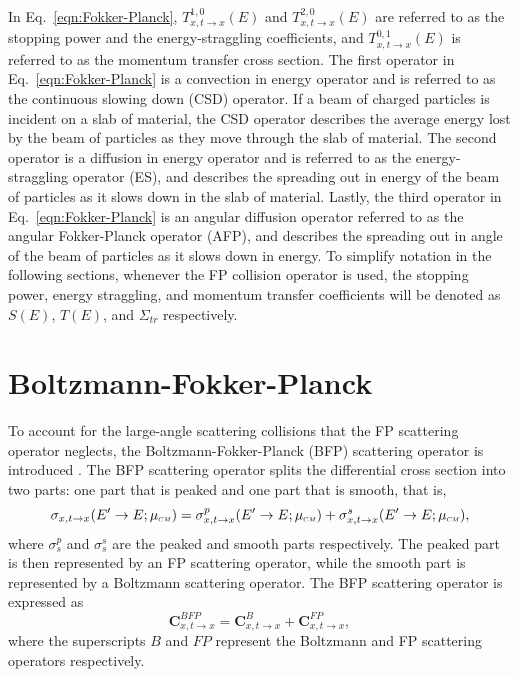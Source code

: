\documentclass[../main.tex]{subfiles}
\begin{document}
In Eq.~\eqref{eqn:Fokker-Planck}, $T_{x,t \rightarrow x}^{1,0}(E)$ and $T_{x,t \rightarrow x}^{2,0}(E)$ are referred to as the stopping power and the energy-straggling coefficients, and $T_{x,t \rightarrow x}^{0,1}(E)$ is referred to as the momentum transfer cross section. The first operator in Eq.~\eqref{eqn:Fokker-Planck} is a convection in energy operator and is referred to as the continuous slowing down (CSD) operator. If a beam of charged particles is incident on a slab of material, the CSD operator describes the average energy lost by the beam of particles as they move through the slab of material. The second operator is a diffusion in energy operator and is referred to as the energy-straggling operator (ES), and describes the spreading out in energy of the beam of particles as it slows down in the slab of material. Lastly, the third operator in Eq.~\eqref{eqn:Fokker-Planck} is an angular diffusion operator referred to as the angular Fokker-Planck operator (AFP), and describes the spreading out in angle of the beam of particles as it slows down in energy. To simplify notation in the following sections, whenever the FP collision operator is used, the stopping power, energy straggling, and momentum transfer coefficients will be denoted as $S(E)$, $T(E)$, and $\Sigma_{tr}$ respectively.

\section{Boltzmann-Fokker-Planck}
To account for the large-angle scattering collisions that the FP scattering operator neglects, the Boltzmann-Fokker-Planck (BFP) scattering operator is introduced \cite{Ligou-1986}. The BFP scattering operator splits the differential cross section into two parts: one part that is peaked and one part that is smooth, that is,
\begin{equation}
    \sigma_{x,t \rightarrow x}(E^{\prime} \rightarrow E; \mucm) = \sigma_{x,t \rightarrow x}^{p}(E^{\prime} \rightarrow E; \mucm) + \sigma_{x,t \rightarrow x}^{s}(E^{\prime} \rightarrow E; \mucm),
\end{equation}
where $\sigma_s^{p}$ and $\sigma_s^{s}$ are the peaked and smooth parts respectively. The peaked part is then represented by an FP scattering operator, while the smooth part is represented by a Boltzmann scattering operator. The BFP scattering operator is expressed as
\begin{equation} \label{eqn:BFP-operator}
    \boldsymbol{C}_{x,t \rightarrow x}^{BFP} = \boldsymbol{C}_{x,t \rightarrow x}^{B} + \boldsymbol{C}_{x,t \rightarrow x}^{FP},
\end{equation}
where the superscripts $B$ and $FP$ represent the Boltzmann and FP scattering operators respectively.
\end{document}
